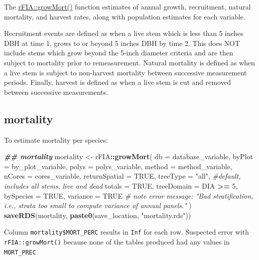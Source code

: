 \documentclass[
]{book}
\newenvironment{Shaded}{\begin{snugshade}}{\end{snugshade}}
\newcommand{\AttributeTok}[1]{\textcolor[rgb]{0.13,0.29,0.53}{#1}}
\newcommand{\CommentTok}[1]{\textcolor[rgb]{0.56,0.35,0.01}{\textit{#1}}}
\newcommand{\ConstantTok}[1]{\textcolor[rgb]{0.56,0.35,0.01}{#1}}
\newcommand{\DecValTok}[1]{\textcolor[rgb]{0.00,0.00,0.81}{#1}}
\newcommand{\DocumentationTok}[1]{\textcolor[rgb]{0.56,0.35,0.01}{\textbf{\textit{#1}}}}
\newcommand{\FunctionTok}[1]{\textcolor[rgb]{0.13,0.29,0.53}{\textbf{#1}}}
\newcommand{\NormalTok}[1]{#1}
\newcommand{\OtherTok}[1]{\textcolor[rgb]{0.56,0.35,0.01}{#1}}
\newcommand{\SpecialCharTok}[1]{\textcolor[rgb]{0.81,0.36,0.00}{\textbf{#1}}}
\newcommand{\StringTok}[1]{\textcolor[rgb]{0.31,0.60,0.02}{#1}}
\begin{document}
The \href{https://rdrr.io/cran/rFIA/man/growMort.html}{rFIA::growMort()} function estimates of annual growth, recruitment, natural mortality, and harvest rates, along with population estimates for each variable.

Recruitment events are defined as when a live stem which is less than 5 inches DBH at time 1, grows to or beyond 5 inches DBH by time 2. This does NOT include stems which grow beyond the 5-inch diameter criteria and are then subject to mortality prior to remeasurement. Natural mortality is defined as when a live stem is subject to non-harvest mortality between successive measurement periods. Finally, harvest is defined as when a live stem is cut and removed between successive measurements.

\hypertarget{mortality}{%
\subsection{mortality}\label{mortality}}

To estimate mortality per species:

\begin{Shaded}
\begin{Highlighting}[]
\DocumentationTok{\#\# mortality}
\NormalTok{mortality }\OtherTok{\textless{}{-}}\NormalTok{ rFIA}\SpecialCharTok{::}\FunctionTok{growMort}\NormalTok{(}
  \AttributeTok{db =}\NormalTok{ database\_variable,}
  \AttributeTok{byPlot =}\NormalTok{ by\_plot\_variable,}
  \AttributeTok{polys =}\NormalTok{ polys\_variable,}
  \AttributeTok{method =}\NormalTok{ method\_variable,}
  \AttributeTok{nCores =}\NormalTok{ cores\_variable,}
  \AttributeTok{returnSpatial =} \ConstantTok{TRUE}\NormalTok{,}
  \AttributeTok{treeType =} \StringTok{"all"}\NormalTok{, }\CommentTok{\#default, includes all stems, live and dead}
  \AttributeTok{totals =} \ConstantTok{TRUE}\NormalTok{,}
  \AttributeTok{treeDomain =}\NormalTok{ DIA }\SpecialCharTok{\textgreater{}=} \DecValTok{5}\NormalTok{,}
  \AttributeTok{bySpecies =} \ConstantTok{TRUE}\NormalTok{,}
  \AttributeTok{variance =} \ConstantTok{TRUE} \CommentTok{\# note error message: "Bad stratification, i.e., strata too small to compute variance of annual panels." }
\NormalTok{)}
\FunctionTok{saveRDS}\NormalTok{(mortality, }\FunctionTok{paste0}\NormalTok{(save\_location, }\StringTok{"mortality.rds"}\NormalTok{))}
\end{Highlighting}
\end{Shaded}

Column \texttt{mortality\$MORT\_PERC} results in \texttt{Inf} for each row. Suspected error with \texttt{rFIA::growMort()} because none of the tables produced had any values in \texttt{MORT\_PREC}
\end{document}
